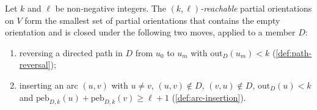 \begin{definition}
  \label{def:reachable-orientation}
  \leanok
  Let $k$ and $\ell$ be non-negative integers. The
  \emph{$(k, \ell)$-reachable} partial orientations on $V$ form the
  smallest set of partial orientations that contains the empty
  orientation and is closed under the following two moves, applied to
  a member $D$:
  \begin{enumerate}
    \item reversing a directed path in $D$ from $u_0$ to $u_m$ with
      $\mathrm{out}_D(u_m) < k$ (\cref{def:path-reversal});
    \item inserting an arc $(u, v)$ with $u \ne v$, $(u, v) \notin D$,
      $(v, u) \notin D$, $\mathrm{out}_D(u) < k$ and
      $\mathrm{peb}_{D, k}(u) + \mathrm{peb}_{D, k}(v) \ge \ell + 1$
      (\cref{def:arc-insertion}).
  \end{enumerate}
\end{definition}


